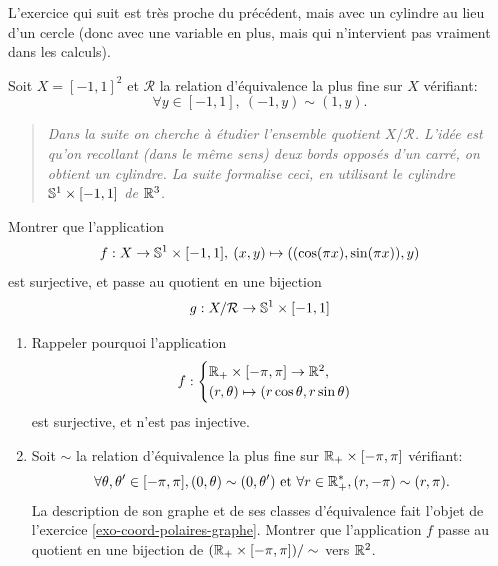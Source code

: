 L'exercice qui suit est très proche du précédent, mais avec un cylindre au lieu d'un cercle (donc avec une variable en plus, mais qui n'intervient pas vraiment dans les calculs).

\begin{exercice}
Soit $X=[-1,1]^2$ et $\mathcal R$ la relation d'équivalence la plus fine sur $X$ vérifiant:
\[ \forall y\in [-1,1], \: (-1,y)\sim (1,y).\]
\begin{quote}
\emph{Dans la suite on cherche à étudier l'ensemble quotient $X/\mathcal R$. L'idée est qu'on recollant (dans le même sens) deux bords opposés d'un carré, on obtient un cylindre. La suite formalise ceci, en utilisant le cylindre $\S^1\times [-1,1]$ de $\R^3$.}
\end{quote}
Montrer que l'application
\[ f : X \to \S^1\times [-1,1], \: (x,y) \mapsto ((\cos(\pi x), \sin(\pi x)), y)\]
est surjective, et passe au quotient en une bijection
\[ g : X/\mathcal R \to \S^1\times [-1,1]\]
\end{exercice}


\begin{exercice}
\begin{enumerate}
\item Rappeler pourquoi l'application
\[ f : \begin{cases}\R_+\times [-\pi,\pi] \to \R^2,\\  (r,\theta) \mapsto (r\cos\theta,r\sin\theta)\end{cases}\]
est surjective, et n'est pas injective.
\item Soit $\sim$ la relation d'équivalence la plus fine sur $\R_+\times [-\pi,\pi]$ vérifiant: 
\[
\forall \theta,\theta'\in [-\pi,\pi], (0,\theta)\sim (0,\theta')  \text{ et  } \forall r\in \R_+^*, (r,-\pi)\sim (r,\pi).
\]
La description de son graphe et de ses classes d'équivalence fait l'objet de l'exercice \ref{exo-coord-polaires-graphe}. Montrer que l'application $f$ passe au quotient en une bijection  de $(\R_+\times [-\pi,\pi]) / \sim$ vers $\R^2$.
\end{enumerate}
\end{exercice}



